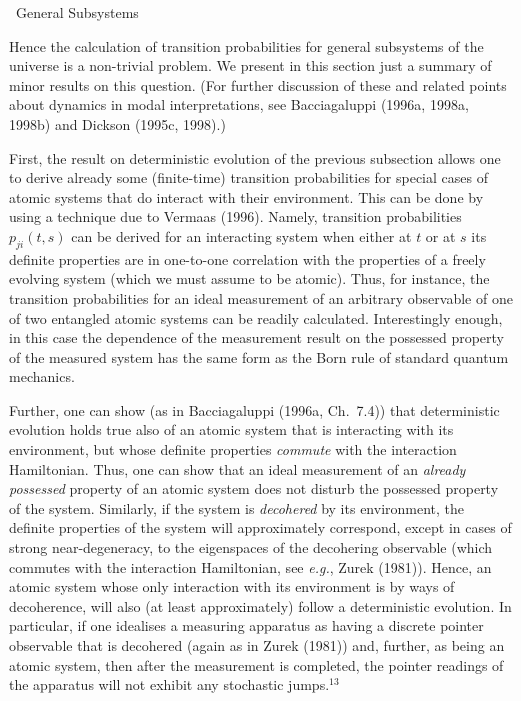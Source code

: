 \documentclass[12pt]{article}
\renewcommand{\subsection}[1]{\addtocounter{subsection}{1}
                           \setcounter{subsubsection}{0}
                           \vspace{20pt}
                           \begin{center}
                           \thesubsection \ #1
                           \end{center}
                           \vspace{20pt}}
\newcommand{\eg}{{\it e.g.}}
\begin{document}
\subsection{General Subsystems}


Hence the calculation of transition probabilities for general 
subsystems of the universe is a non-trivial problem.  We present in 
this section just a summary of minor results on this question.  (For 
further discussion of these and related points about dynamics in modal 
interpretations, see Bacciagaluppi (1996a, 1998a, 1998b) and Dickson 
(1995c, 1998).)

First, the result on deterministic evolution of the previous 
subsection allows one to derive already some (finite-time) transition 
probabilities for special cases of atomic systems that do interact 
with their environment.  This can be done by using a technique due to 
Vermaas (1996).  Namely, transition probabilities $p_{ji}(t,s)$ can be 
derived for an interacting system when either at $t$ or at $s$ its 
definite properties are in one-to-one correlation with the properties 
of a freely evolving system (which we must assume to be atomic).  
Thus, for instance, the transition probabilities for an ideal 
measurement of an arbitrary observable of one of two entangled atomic 
systems can be readily calculated.  Interestingly enough, in this case 
the dependence of the measurement result on the possessed property of 
the measured system has the same form as the Born rule of standard 
quantum mechanics.

Further, one can show (as in Bacciagaluppi (1996a, Ch.~7.4)) that 
deterministic evolution holds true also of an atomic system that is 
interacting with its environment, but whose definite properties {\em 
commute} with the interaction Hamiltonian.  Thus, one can show that an 
ideal measurement of an {\em already possessed} property of an atomic 
system does not disturb the possessed property of the system.  
Similarly, if the system is {\em decohered} by its environment, the 
definite properties of the system will approximately correspond, 
except in cases of strong near-degeneracy, to the eigenspaces of the 
decohering observable (which commutes with the interaction 
Hamiltonian, see \eg, Zurek (1981)).  Hence, an atomic system whose 
only interaction with its environment is by ways of decoherence, will 
also (at least approximately) follow a deterministic evolution.  In 
particular, if one idealises a measuring apparatus as having a 
discrete pointer observable that is decohered (again as in Zurek 
(1981)) and, further, as being an atomic system, then after the 
measurement is completed, the pointer readings of the apparatus will 
not exhibit any stochastic jumps.$^{13}$
\end{document}
